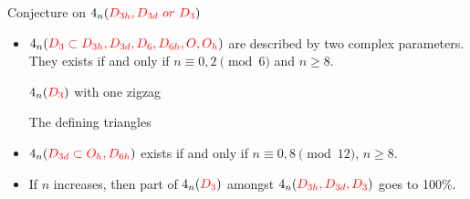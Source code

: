 \documentclass[%
pdf,
colorBG,
slideColor,
]{prosper}
\begin{document}
\begin{slide}{Conjecture on $4_n(\textcolor{red}{D_{3h},D_{3d}\,\,or\,\, D_3})$}
\vspace{-3mm}
\begin{itemize}
\item $4_n(\textcolor{red}{D_3 \subset  D_{3h}, D_{3d}, D_6, D_{6h}, O, O_h})$ are described by two complex parameters. They exists if and only if $n\equiv 0,2\pmod 6$ and $n\geq 8$.
\begin{center}
\begin{minipage}{50mm}
\par
$4_n(\textcolor{red}{D_3})$ with one zigzag
\end{minipage}
\begin{minipage}{50mm}
\par
The defining triangles
\end{minipage}

\end{center}


\item $4_n(\textcolor{red}{D_{3d} \subset O_h, D_{6h}})$ exists if and only if $n\equiv 0,8\pmod {12}$, $n\geq 8$.

\item If $n$ increases, then part of $4_n(\textcolor{red}{D_3})$ amongst $4_n(\textcolor{red}{D_{3h},D_{3d}, D_3})$ goes to 100\%.
\end{itemize}

\end{slide}
\end{document}
